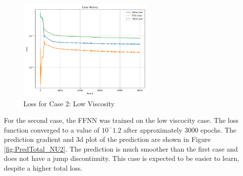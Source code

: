 \documentclass[11pt]{article}
\begin{document}
\begin{figure}[h]
    \centering
    \includegraphics[width=0.6\textwidth]{1D_Loss_NU2.png}
    \caption{Loss for Case 2: Low Viscosity}
    \label{fig:Loss_NU2}
\end{figure}
For the second case, the FFNN was trained on the low viscocity case. The loss function converged to a value of $10^-1.2$ after approximately 3000 epochs. The prediction gradient and 3d plot of the prediction are shown in Figure \ref{fig:PredTotal_NU2}. The prediction is much smoother than the first case and does not have a jump discontinuity. This case is expected to be easier to learn, despite a higher total loss. 

\pagebreak 
\end{document}
